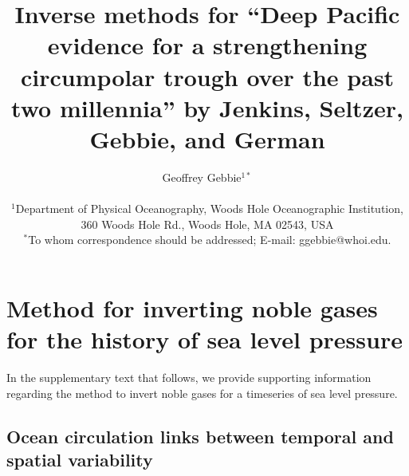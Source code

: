 \documentclass[12pt]{article}
\title{Inverse methods for ``Deep Pacific
evidence for a strengthening circumpolar trough over the past two
millennia'' by Jenkins, Seltzer, Gebbie, and German}
\author
{Geoffrey Gebbie$^{1\ast}$ \\
\\
\normalsize{$^{1}$Department of Physical Oceanography, Woods Hole Oceanographic Institution,}\\
\normalsize{360 Woods Hole Rd., Woods Hole, MA 02543, USA}\\ 
\normalsize{$^\ast$To whom correspondence should be addressed; E-mail:  ggebbie@whoi.edu.}
}
\date{}
\newenvironment{sciabstract}{%
\begin{quote} \bf}
{\end{quote}}
\begin{document}
 


\baselineskip24pt


\maketitle 


\begin{sciabstract}
\end{sciabstract}


\section{Method for inverting noble gases for the history of sea level pressure} 

In the supplementary text that follows, we provide supporting
information regarding the method to invert noble gases for a
timeseries of sea level pressure. %

\subsection{Ocean circulation links between temporal and spatial variability}
\label{sec:hist-surf-vari}
\end{document}
